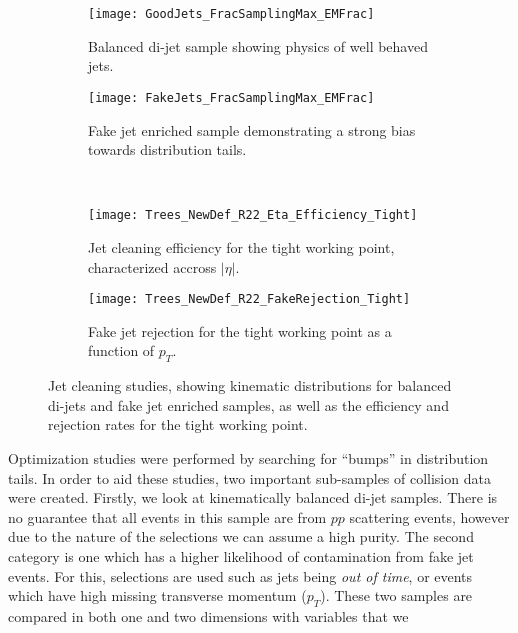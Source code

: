 \documentclass[12pt]{article}
\begin{document}
\begin{figure}[t!]
    \centering
    \begin{subfigure}[t]{.48\textwidth}
        \centering
        \texttt{[image: GoodJets\_FracSamplingMax\_EMFrac]}
        \caption{Balanced di-jet sample showing physics of well behaved jets.}
        \label{subfig:good_jets_th2}
    \end{subfigure}
    \hfill
    \begin{subfigure}[t]{.48\textwidth}
        \centering
        \texttt{[image: FakeJets\_FracSamplingMax\_EMFrac]}
        \caption{Fake jet enriched sample demonstrating a strong bias towards
        distribution tails.}
        \label{subfig:fake_jets_th2}
    \end{subfigure} %
    ~
    \begin{subfigure}[t]{.48\textwidth}
        \centering
        \texttt{[image: Trees\_NewDef\_R22\_Eta\_Efficiency\_Tight]}
        \caption{Jet cleaning efficiency for the tight working point,
        characterized accross $|\eta|$.}
        \label{subfig:cleaning_perf_eff_eta_tight}
    \end{subfigure}
    \hfill
    \begin{subfigure}[t]{.48\textwidth}
        \centering
        \texttt{[image: Trees\_NewDef\_R22\_FakeRejection\_Tight]}
        \caption{Fake jet rejection for the tight working point as a function of
        $p_T$.}
        \label{subfig:cleaning_perf_rejection_tight}
    \end{subfigure}
\caption{Jet cleaning studies, showing kinematic distributions for balanced
di-jets and fake jet enriched samples, as well as the efficiency and rejection
rates for the tight working point.}
\label{fig:jet_cleaning}
\end{figure}
Optimization studies were performed by searching for ``bumps'' in distribution
tails. In order to aid these studies, two important sub-samples of collision
data were created. Firstly, we look at kinematically balanced di-jet samples.
There is no guarantee that all events in this sample are from $pp$ scattering
events, however due to the nature of the selections we can assume a high purity.
The second category is one which has a higher likelihood of contamination from
fake jet events. For this, selections are used such as jets being \textit{out of
time}, or events which have high missing transverse momentum ($p_T$). These two
samples are compared in both one and two dimensions with variables that we
\end{document}
